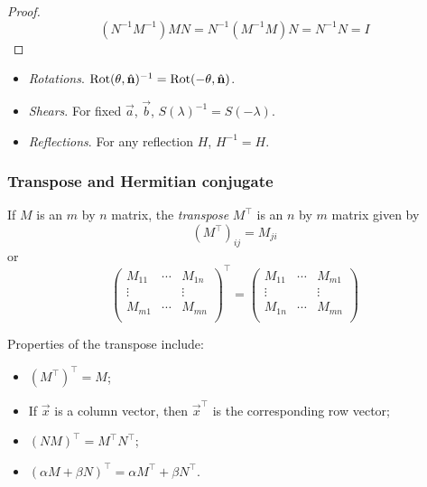 \documentclass{../template/note}
\begin{document}
    \begin{proof}
        \[
            (N^{-1}M^{-1})MN = N^{-1}(M^{-1}M)N = N^{-1}N = I
        \]
    \end{proof}
    
    \begin{example}
        \begin{itemize}
            \item \emph{Rotations}. \(\Rot(\theta, \hvec n)^{-1} = \Rot(-\theta, \hvec n)\).
            \item \emph{Shears}. For fixed \(\vec a\), \(\vec b\), \(S(\lambda)^{-1} = S(-\lambda)\).
            \item \emph{Reflections}. For any reflection \(H\), \(H^{-1} = H\).
        \end{itemize}
    \end{example}
    
    \subsubsection{Transpose and Hermitian conjugate}

    \begin{definition}
        If \(M\) is an \(m\) by \(n\) matrix, the \emph{transpose} \(M^\intercal\) is an \(n\) by \(m\) matrix given by
        \[
            (M^\intercal)_{ij} = M_{ji}
        \]
        or
        \[
            \begin{pmatrix}
             M_{11} & \cdots & M_{1n} \\
             \vdots &  & \vdots \\
             M_{m1} & \cdots & M_{mn} \\
            \end{pmatrix}^\intercal =
            \begin{pmatrix}
             M_{11} & \cdots & M_{m1} \\
             \vdots &  & \vdots \\
             M_{1n} & \cdots & M_{mn} \\
            \end{pmatrix}
        \]
    \end{definition}
    
    Properties of the transpose include:

    \begin{itemize}
        \item \((M^\intercal)^\intercal = M\); 
        \item If \(\vec x\) is a column vector, then \(\vec x^\intercal\) is the corresponding row vector;
        \item \((NM)^\intercal = M^\intercal N^\intercal\);
        \item \((\alpha M + \beta N)^\intercal = \alpha M^\intercal + \beta N^\intercal\).
    \end{itemize}
    
\end{document}
